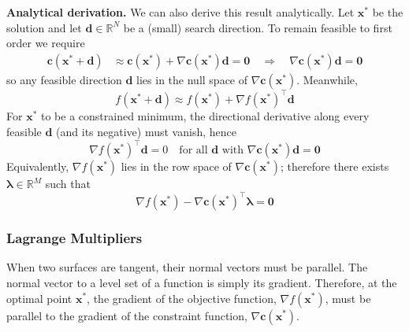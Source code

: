 \textbf{Analytical derivation.} We can also derive this result analytically. Let \(\mathbf{x}^*\) be the solution and let \(\mathbf{d}\in\mathbb{R}^N\) be a (small) search direction. To remain feasible to first order we require
\begin{equation}
\begin{aligned}
\mathbf{c}(\mathbf{x}^*+\mathbf{d})
&\approx \mathbf{c}(\mathbf{x}^*) + \nabla \mathbf{c}(\mathbf{x}^*) \mathbf{d}
= \mathbf{0}
\quad\Longrightarrow\quad
\nabla \mathbf{c}(\mathbf{x}^*)\mathbf{d}=\mathbf{0}
\end{aligned}
\end{equation}
so any feasible direction \(\mathbf{d}\) lies in the null space of \(\nabla \mathbf{c}(\mathbf{x}^*)\). Meanwhile,
\begin{equation}
f(\mathbf{x}^*+\mathbf{d}) \approx f(\mathbf{x}^*) + \nabla f(\mathbf{x}^*)^{\!\top}\mathbf{d}
\end{equation}
For \(\mathbf{x}^*\) to be a constrained minimum, the directional derivative along every feasible \(\mathbf{d}\) (and its negative) must vanish, hence
\begin{equation}
\nabla f(\mathbf{x}^*)^{\!\top}\mathbf{d}=0
\quad\text{for all }\mathbf{d}\text{ with } \nabla \mathbf{c}(\mathbf{x}^*)\mathbf{d}=\mathbf{0}
\end{equation}
Equivalently, \(\nabla f(\mathbf{x}^*)\) lies in the row space of \(\nabla \mathbf{c}(\mathbf{x}^*)\); therefore there exists \(\boldsymbol{\lambda}\in\mathbb{R}^M\) such that
\begin{equation}
\nabla f(\mathbf{x}^*)-\nabla \mathbf{c}(\mathbf{x}^*)^{\!\top}\boldsymbol{\lambda}=\mathbf{0}
\end{equation}

\subsubsection{Lagrange Multipliers} 
When two surfaces are tangent, their normal vectors must be parallel. The normal vector to a level set of a function is simply its gradient. Therefore, at the optimal point $\mathbf{x}^*$, the gradient of the objective function, $\nabla f(\mathbf{x}^*)$, must be parallel to the gradient of the constraint function, $\nabla \mathbf{c}(\mathbf{x}^*)$.

